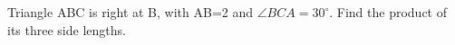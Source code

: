 Triangle ABC is right at B, with AB=2 and $\angle BCA=30^\circ$. Find the product of its three side lengths.
